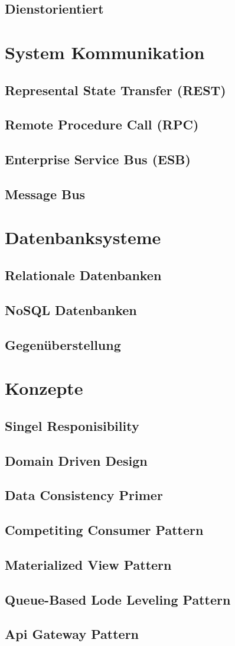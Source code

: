 	
	
	\subsection{Dienstorientiert}

\section{System Kommunikation}
	\subsection{Represental State Transfer (REST)}
	\subsection{Remote Procedure Call (RPC)}
	\subsection{Enterprise Service Bus (ESB)}
	\subsection{Message Bus}

\section{Datenbanksysteme}
	\subsection{Relationale Datenbanken}
	\subsection{NoSQL Datenbanken}
	\subsection{Gegenüberstellung}
	
\section{Konzepte}
	\subsection{Singel Responisibility}
	\subsection{Domain Driven Design}
	\subsection{Data Consistency Primer}
	\subsection{Competiting Consumer Pattern}
	\subsection{Materialized View Pattern}
	\subsection{Queue-Based Lode Leveling Pattern}
	\subsection{Api Gateway Pattern}

